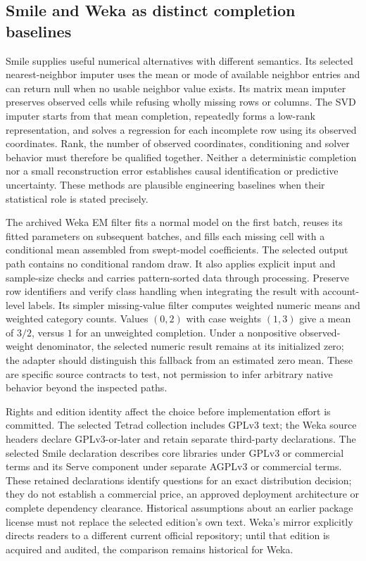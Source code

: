 \subsection*{Smile and Weka as distinct completion baselines}
Smile supplies useful numerical alternatives with different semantics. Its selected nearest-neighbor imputer uses the mean or mode of available neighbor entries and can return null when no usable neighbor value exists. Its matrix mean imputer preserves observed cells while refusing wholly missing rows or columns. The SVD imputer starts from that mean completion, repeatedly forms a low-rank representation, and solves a regression for each incomplete row using its observed coordinates. Rank, the number of observed coordinates, conditioning and solver behavior must therefore be qualified together. Neither a deterministic completion nor a small reconstruction error establishes causal identification or predictive uncertainty. These methods are plausible engineering baselines when their statistical role is stated precisely.~\citep{exec25_jtm_smile}

The archived Weka EM filter fits a normal model on the first batch, reuses its fitted parameters on subsequent batches, and fills each missing cell with a conditional mean assembled from swept-model coefficients. The selected output path contains no conditional random draw. It also applies explicit input and sample-size checks and carries pattern-sorted data through processing. Preserve row identifiers and verify class handling when integrating the result with account-level labels. Its simpler missing-value filter computes weighted numeric means and weighted category counts. Values $(0,2)$ with case weights $(1,3)$ give a mean of $3/2$, versus $1$ for an unweighted completion. Under a nonpositive observed-weight denominator, the selected numeric result remains at its initialized zero; the adapter should distinguish this fallback from an estimated zero mean. These are specific source contracts to test, not permission to infer arbitrary native behavior beyond the inspected paths.~\citep{exec25_jtm_weka,exec25_jtm_choice}

Rights and edition identity affect the choice before implementation effort is committed. The selected Tetrad collection includes GPLv3 text; the Weka source headers declare GPLv3-or-later and retain separate third-party declarations. The selected Smile declaration describes core libraries under GPLv3 or commercial terms and its Serve component under separate AGPLv3 or commercial terms. These retained declarations identify questions for an exact distribution decision; they do not establish a commercial price, an approved deployment architecture or complete dependency clearance. Historical assumptions about an earlier package license must not replace the selected edition's own text. Weka's mirror explicitly directs readers to a different current official repository; until that edition is acquired and audited, the comparison remains historical for Weka.~\citep{exec25_jtm_tetrad,exec25_jtm_smile,exec25_jtm_weka}

